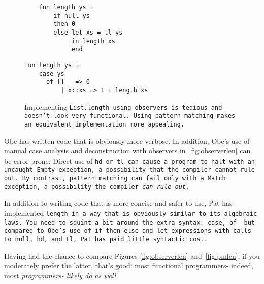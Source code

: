 \documentclass[manuscript,screen,review, 12pt]{acmart}
\begin{document}
\begin{outline}[enumerate]
    \begin{figure}[h]
        \centering
      \begin{minipage}[t]{0.4\textwidth}
        \begin{verbatim}
    fun length ys =
        if null ys 
        then 0 
        else let xs = tl ys 
             in length xs 
             end 
            \end{verbatim}
            \label{fig:observerlen} 
      \end{minipage}
      \quad
      \begin{minipage}[t]{0.4\textwidth}
        \begin{verbatim}
fun length ys =
    case ys 
      of []   => 0
          | x::xs => 1 + length xs
                \end{verbatim}
       \vspace{2.2em}
       \label{fig:pmlen}
      \end{minipage}
      \caption{Implementing \tt{List.length} using observers is tedious and doesn't
      look very functional. Using pattern matching makes an equivalent
      implementation more appealing.}
      \label{fig:len}
    \end{figure}
    
    Obe has written code that is obviously more verbose. In addition, Obe's use
    of manual case analysis and deconstruction with observers
    in~\ref{fig:observerlen} can be error-prone: Direct use of \tt{hd} or
    \tt{tl} can cause a program to halt with an uncaught \tt{Empty} exception, a
    possibility that the compiler cannot rule out. By contrast, pattern matching
    can fail only with a \tt{Match} exception, a possibility the compiler
    \it{can} rule out. 
    
    In addition to writing code that is more concise and safer to use, Pat has
    implemented \tt{length} in a way that is obviously similar to its algebraic
    laws. You need to squint a bit around the extra syntax- \tt{case}, \tt{of}-
    but compared to Obe's use of \tt{if-then-else} and \tt{let} expressions with
    calls to \tt{null}, \tt{hd}, and \tt{tl}, Pat has paid little syntactic
    cost. 

    Having had the chance to compare Figures \ref{fig:observerlen}
    and~\ref{fig:pmlen}, if you moderately prefer the latter, that's good: most
    functional programmers- indeed, most \it{programmers}- likely do as well. 


\end{outline}
\end{document}
